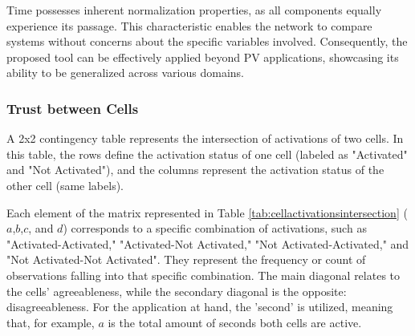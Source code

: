 Time possesses inherent normalization properties, as all components equally experience its passage. This characteristic enables the network to compare systems without concerns about the specific variables involved. Consequently, the proposed tool can be effectively applied beyond PV applications, showcasing its ability to be generalized across various domains.

\subsubsection{Trust between Cells}

A 2x2 contingency table represents the intersection of activations of two cells. In this table, the rows define the activation status of one cell (labeled as "Activated" and "Not Activated"), and the columns represent the activation status of the other cell (same labels).

\begin{table}[h!]
    \centering
    \caption{Contigency table representing the activation intersection of two cells.}
    \label{tab:cellactivationsintersection}
\end{table}

Each element of the matrix represented in Table \ref{tab:cellactivationsintersection} ($a$,$b$,$c$, and $d$) corresponds to a specific combination of activations, such as "Activated-Activated," "Activated-Not Activated," "Not Activated-Activated," and "Not Activated-Not Activated". They represent the frequency or count of observations falling into that specific combination. The main diagonal relates to the cells' agreeableness, while the secondary diagonal is the opposite: disagreeableness. For the application at hand, the 'second' is utilized, meaning that, for example, $a$ is the total amount of seconds both cells are active.

